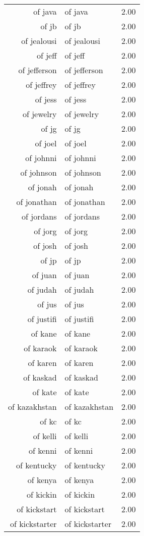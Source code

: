 \begin{table}[ht]
\begin{tabular}{rlr}
  of java & of java & 2.00 \\ 
  of jb & of jb & 2.00 \\ 
  of jealousi & of jealousi & 2.00 \\ 
  of jeff & of jeff & 2.00 \\ 
  of jefferson & of jefferson & 2.00 \\ 
  of jeffrey & of jeffrey & 2.00 \\ 
  of jess & of jess & 2.00 \\ 
  of jewelry & of jewelry & 2.00 \\ 
  of jg & of jg & 2.00 \\ 
  of joel & of joel & 2.00 \\ 
  of johnni & of johnni & 2.00 \\ 
  of johnson & of johnson & 2.00 \\ 
  of jonah & of jonah & 2.00 \\ 
  of jonathan & of jonathan & 2.00 \\ 
  of jordans & of jordans & 2.00 \\ 
  of jorg & of jorg & 2.00 \\ 
  of josh & of josh & 2.00 \\ 
  of jp & of jp & 2.00 \\ 
  of juan & of juan & 2.00 \\ 
  of judah & of judah & 2.00 \\ 
  of jus & of jus & 2.00 \\ 
  of justifi & of justifi & 2.00 \\ 
  of kane & of kane & 2.00 \\ 
  of karaok & of karaok & 2.00 \\ 
  of karen & of karen & 2.00 \\ 
  of kaskad & of kaskad & 2.00 \\ 
  of kate & of kate & 2.00 \\ 
  of kazakhstan & of kazakhstan & 2.00 \\ 
  of kc & of kc & 2.00 \\ 
  of kelli & of kelli & 2.00 \\ 
  of kenni & of kenni & 2.00 \\ 
  of kentucky & of kentucky & 2.00 \\ 
  of kenya & of kenya & 2.00 \\ 
  of kickin & of kickin & 2.00 \\ 
  of kickstart & of kickstart & 2.00 \\ 
  of kickstarter & of kickstarter & 2.00 \\ 

\end{tabular}
\end{table}
